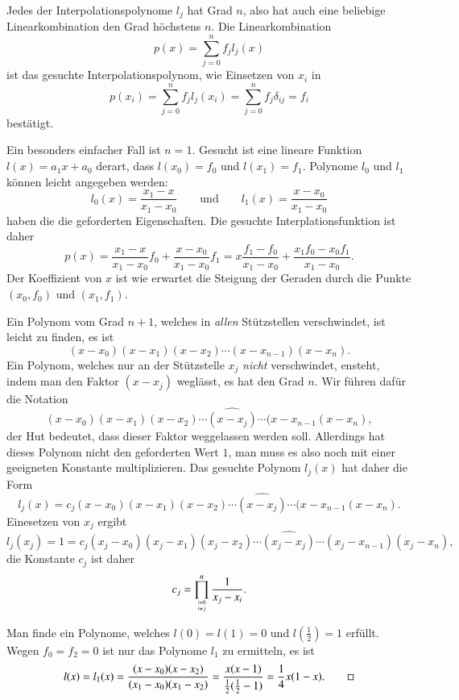 Jedes der Interpolationspolynome $l_j$ hat Grad $n$, also hat auch eine
beliebige Linearkombination den Grad höchstens $n$.
Die Linearkombination
\[
p(x) = \sum_{j=0}^n f_j l_j(x)
\]
ist das gesuchte Interpolationspolynom, wie Einsetzen von $x_i$ in
\[
p(x_i)
=
\sum_{j=0}^n f_jl_j(x_i)
=
\sum_{j=0}^n f_j\delta_{ij}
=
f_i
\]
bestätigt.

\begin{beispiel}
Ein besonders einfacher Fall ist $n=1$.
Gesucht ist eine lineare Funktion $l(x)=a_1x+a_0$ derart, dass
$l(x_0)=f_0$ und $l(x_1)=f_1$.
Polynome $l_0$ und $l_1$ können leicht angegeben werden:
\[
l_0(x) = \frac{x_1-x}{x_1-x_0}
\qquad\text{und}\qquad
l_1(x) = \frac{x-x_0}{x_1-x_0}
\]
haben die die geforderten Eigenschaften.
Die gesuchte Interplationsfunktion ist daher
\[
p(x)
=
\frac{x_1-x}{x_1-x_0}f_0 + \frac{x-x_0}{x_1-x_0} f_1
=
x \frac{f_1-f_0}{x_1-x_0}   + \frac{x_1f_0-x_0f_1}{x_1-x_0}.
\]
Der Koeffizient von $x$ ist wie erwartet die Steigung der Geraden durch
die Punkte $(x_0,f_0)$ und $(x_1,f_1)$.
\end{beispiel}

Ein Polynom vom Grad $n+1$, welches in {\em allen} Stützstellen verschwindet,
ist leicht zu finden, es ist 
\[
(x-x_0)(x-x_1)(x-x_2)\cdots (x-x_{n-1})(x-x_n).
\]
Ein Polynom, welches nur an der Stützstelle $x_j$ {\em nicht} verschwindet,
ensteht, indem man den Faktor $(x-x_j)$ weglässt, es hat den Grad $n$.
Wir führen dafür die Notation
\[
(x-x_0)(x-x_1)(x-x_2)\cdots \widehat{(x-x_j)}\cdots (x-x_{n-1}(x-x_n),
\]
der Hut bedeutet, dass dieser Faktor weggelassen werden soll.
Allerdings hat dieses Polynom nicht den geforderten Wert $1$, man muss es
also noch mit einer geeigneten Konstante multiplizieren.
Das gesuchte Polynom $l_j(x)$ hat daher die Form
\[
l_j(x)
=
c_j(x-x_0)(x-x_1)(x-x_2)\cdots \widehat{(x-x_j)}\cdots (x-x_{n-1}(x-x_n).
\]
Einesetzen von $x_j$ ergibt
\[
l_j(x_j) = 1 = 
c_j(x_j-x_0)(x_j-x_1)(x_j-x_2)\cdots \widehat{(x_j-x_j)}\cdots(x_j-x_{n-1})(x_j-x_n),
\]
die Konstante $c_j$ ist daher
\[
c_j = \prod_{i=0\atop i\ne j}^n \frac{1}{x_j-x_i}.
\]

\begin{beispiel}
Man finde ein Polynome, welches $l(0)=l(1)=0$ und $l(\frac12)=1$
erfüllt.
Wegen $f_0=f_2=0$ ist nur das Polynome $l_1$ zu ermitteln, es ist
\[
l(x) = l_1(x)
=
\frac{(x-x_0)(x-x_2)}{(x_1-x_0)(x_1-x_2)}
=
\frac{x(x-1)}{\frac12(\frac12-1)}
=
\frac14x(1-x).
\qedhere
\]
\end{beispiel}

%
%
